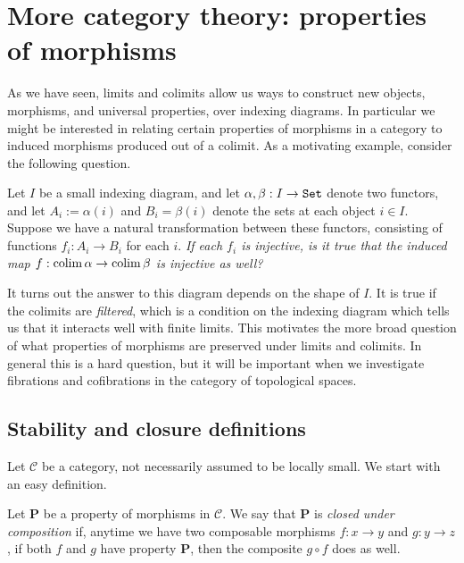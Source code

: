 
\section{More category theory: properties of morphisms}

As we have seen, limits and colimits allow us ways to construct new objects, morphisms, and universal properties, over indexing diagrams. In particular we might be interested in relating certain properties of morphisms in a category to induced morphisms produced out of a colimit. As a motivating example, consider the following question.

\begin{question} Let $I$ be a small indexing diagram, and let $\alpha,\beta: I \to \texttt{Set}$ denote two functors, and let $A_i := \alpha(i)$ and $B_i = \beta(i)$ denote the sets at each object $i\in I$. Suppose we have a natural transformation between these functors, consisting of functions $f_i : A_i \to B_i$ for each $i$. \textit{If each $f_i$ is injective, is it true that the induced map $f: \mathop{\operatorname*{colim}} \alpha \to \mathop{\operatorname*{colim}} \beta$ is injective as well?}
\end{question}

It turns out the answer to this diagram depends on the shape of $I$. It is true if the colimits are \textit{filtered}, which is a condition on the indexing diagram which tells us that it interacts well with finite limits. This motivates the more broad question of what properties of morphisms are preserved under limits and colimits. In general this is a hard question, but it will be important when we investigate fibrations and cofibrations in the category of topological spaces.


\subsection{Stability and closure definitions}



Let $\mathscr{C}$ be a category, not necessarily assumed to be locally small. We start with an easy definition.

\begin{definition}\label{def:closed-under-pullback} Let \textbf{P} be a property of morphisms in $\mathscr{C}$. We say that \textbf{P} is \textit{closed under composition} if, anytime we have two composable morphisms $f: x \to y$ and $g: y \to z$, if both $f$ and $g$ have property \textbf{P}, then the composite $g\circ f$ does as well.
\end{definition}


